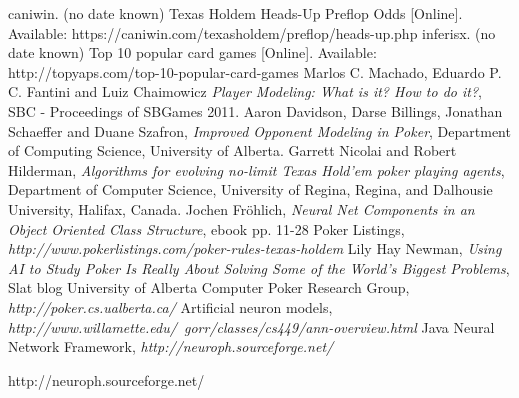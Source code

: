 \begin{thebibliography}{100} 
 caniwin. (no date known) Texas Holdem Heads-Up Preflop Odds [Online]. Available: https://caniwin.com/texasholdem/preflop/heads-up.php
 inferisx. (no date known) Top 10 popular card games [Online]. Available: http://topyaps.com/top-10-popular-card-games
 Marlos C. Machado, Eduardo P. C. Fantini and Luiz Chaimowicz \emph{Player Modeling: What is it? How to do it?}, SBC - Proceedings of SBGames 2011.
 Aaron Davidson, Darse Billings, Jonathan Schaeffer and Duane Szafron, \emph{Improved Opponent Modeling in Poker},
Department of Computing Science, University of Alberta.
 Garrett Nicolai and Robert Hilderman, \emph{Algorithms for evolving no-limit Texas Hold'em poker playing agents}, Department of Computer Science, University of Regina, Regina, and Dalhousie University, Halifax, Canada.
 Jochen Fröhlich, \emph {Neural Net Components in an Object Oriented Class Structure}, 
ebook pp. 11-28
 Poker Listings, \emph {http://www.pokerlistings.com/poker-rules-texas-holdem}
 Lily Hay Newman, \emph{Using AI to Study Poker Is Really About Solving Some of the World’s Biggest Problems}, 
Slat blog
 University of Alberta Computer Poker Research Group, \emph{http://poker.cs.ualberta.ca/}
 Artificial neuron models, \emph{http://www.willamette.edu/~gorr/classes/cs449/ann-overview.html}
 Java Neural Network Framework, \emph{http://neuroph.sourceforge.net/}

http://neuroph.sourceforge.net/
\end{thebibliography}